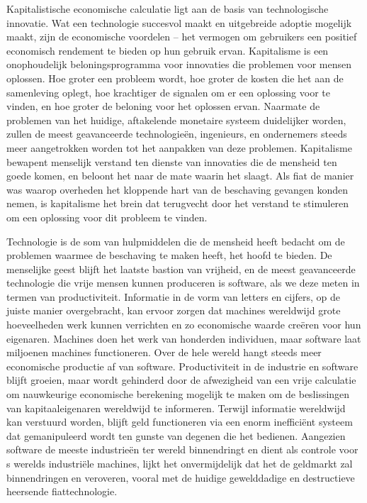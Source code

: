 Kapitalistische economische calculatie ligt aan de basis van technologische innovatie. Wat een technologie succesvol maakt en uitgebreide adoptie mogelijk maakt, zijn de economische voordelen -- het vermogen om gebruikers een positief economisch rendement te bieden op hun gebruik ervan. Kapitalisme is een onophoudelijk beloningsprogramma voor innovaties die problemen voor mensen oplossen. Hoe groter een probleem wordt, hoe groter de kosten die het aan de samenleving oplegt, hoe krachtiger de signalen om er een oplossing voor te vinden, en hoe groter de beloning voor het oplossen ervan. Naarmate de problemen van het huidige, aftakelende monetaire systeem duidelijker worden, zullen de meest geavanceerde technologieën, ingenieurs, en ondernemers steeds meer aangetrokken worden tot het aanpakken van deze problemen. Kapitalisme bewapent menselijk verstand ten dienste van innovaties die de mensheid ten goede komen, en beloont het naar de mate waarin het slaagt. Als fiat de manier was waarop overheden het kloppende hart van de beschaving gevangen konden nemen, is kapitalisme het brein dat terugvecht door het verstand te stimuleren om een oplossing voor dit probleem te vinden.

Technologie is de som van hulpmiddelen die de mensheid heeft bedacht om de problemen waarmee de beschaving te maken heeft, het hoofd te bieden. De menselijke geest blijft het laatste bastion van vrijheid, en de meest geavanceerde technologie die vrije mensen kunnen produceren is software, als we deze meten in termen van productiviteit. Informatie in de vorm van letters en cijfers, op de juiste manier overgebracht, kan ervoor zorgen dat machines wereldwijd grote hoeveelheden werk kunnen verrichten en zo economische waarde creëren voor hun eigenaren. Machines doen het werk van honderden individuen, maar software laat miljoenen machines functioneren. Over de hele wereld hangt steeds meer economische productie af van software. Productiviteit in de industrie en software blijft groeien, maar wordt gehinderd door de afwezigheid van een vrije calculatie om nauwkeurige economische berekening mogelijk te maken om de beslissingen van kapitaaleigenaren wereldwijd te informeren. Terwijl informatie wereldwijd kan verstuurd worden, blijft geld functioneren via een enorm inefficiënt systeem dat gemanipuleerd wordt ten gunste van degenen die het bedienen. Aangezien software de meeste industrieën ter wereld binnendringt en dient als controle voor \textquotesingle s werelds industriële machines, lijkt het onvermijdelijk dat het de geldmarkt zal binnendringen en veroveren, vooral met de huidige gewelddadige en destructieve heersende fiattechnologie.

